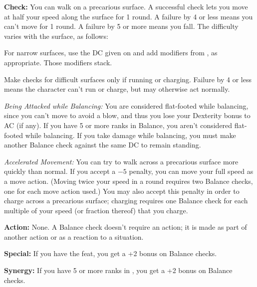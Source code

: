 \textbf{Check:} You can walk on a precarious surface. A successful check lets you move at half your speed along the surface for 1 round. A failure by 4 or less means you can't move for 1 round. A failure by 5 or more means you fall. The difficulty varies with the surface, as follows:



For narrow surfaces, use the DC given on  and add modifiers from , as appropriate. Those modifiers stack.

Make checks for difficult surfaces only if running or charging. Failure by 4 or less means the character can't run or charge, but may otherwise act normally.

\textit{Being Attacked while Balancing:} You are considered flat-footed while balancing, since you can't move to avoid a blow, and thus you lose your Dexterity bonus to AC (if any). If you have 5 or more ranks in Balance, you aren't considered flat-footed while balancing. If you take damage while balancing, you must make another Balance check against the same DC to remain standing.

\textit{Accelerated Movement:} You can try to walk across a precarious surface more quickly than normal. If you accept a $-5$ penalty, you can move your full speed as a move action. (Moving twice your speed in a round requires two Balance checks, one for each move action used.) You may also accept this penalty in order to charge across a precarious surface; charging requires one Balance check for each multiple of your speed (or fraction thereof) that you charge.

\textbf{Action:} None. A Balance check doesn't require an action; it is made as part of another action or as a reaction to a situation.

\textbf{Special:} If you have the  feat, you get a +2 bonus on Balance checks.

\textbf{Synergy:} If you have 5 or more ranks in , you get a +2 bonus on Balance checks.